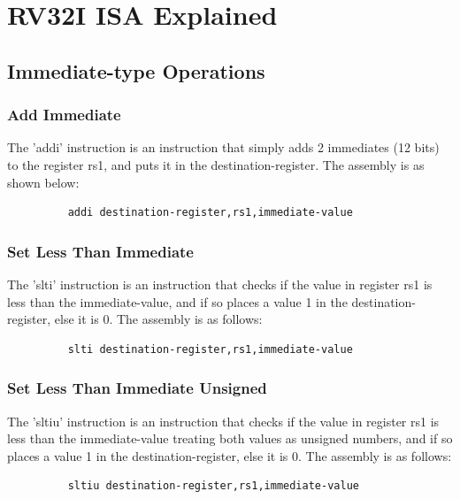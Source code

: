 \tableofcontents
\newpage



\section{RV32I ISA Explained}
\subsection{Immediate-type Operations}

\subsubsection{Add Immediate}
\qquad
The 'addi' instruction is an instruction that simply adds 2 immediates (12 bits) to the register rs1, and puts it in the destination-register. The assembly is as shown below:
\begin{figure}[!htbp]
    \centering
    \begin{verbatim}
    addi destination-register,rs1,immediate-value
    \end{verbatim}
\end{figure}\newline

\subsubsection{Set Less Than Immediate}
\qquad
The 'slti' instruction is an instruction that checks if the value in register rs1 is less than the immediate-value, and if so places a value 1 in the destination-register, else it is 0. The assembly is as follows:
\begin{figure}[!htbp]
    \centering
    \begin{verbatim}
    slti destination-register,rs1,immediate-value
    \end{verbatim}
\end{figure}\newline

\subsubsection{Set Less Than Immediate Unsigned}
\qquad
The 'sltiu' instruction is an instruction that checks if the value in register rs1 is less than the immediate-value treating both values as unsigned numbers, and if so places a value 1 in the destination-register, else it is 0. The assembly is as follows:
\begin{figure}[!htbp]
    \centering
    \begin{verbatim}
    sltiu destination-register,rs1,immediate-value
    \end{verbatim}
\end{figure}\newline

